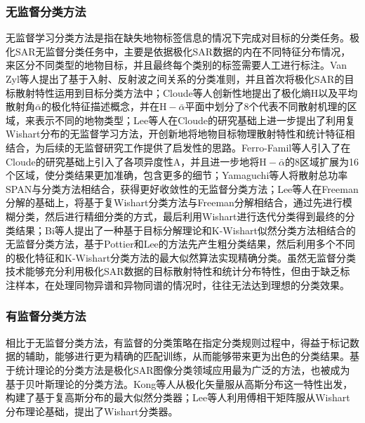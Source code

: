 \subsubsection{无监督分类方法}
无监督学习分类方法是指在缺失地物标签信息的情况下完成对目标的分类任务。极化SAR无监督分类任务中，主要是依据极化SAR数据的内在不同特征分布情况，来区分不同类型的地物目标，并且最终每个类别的标签需要人工进行标注。Van Zyl等人提出了基于入射、反射波之间关系的分类准则，并且首次将极化SAR的目标散射特性运用到目标分类方法中；Cloude等人创新性地提出了极化熵$\mathrm{H}$以及平均散射角$\bar{\alpha}$的极化特征描述概念，并在$\mathrm{H}-\bar{\alpha}$平面中划分了8个代表不同散射机理的区域，来表示不同的地物类型；Lee等人在Cloude的研究基础上进一步提出了利用复Wishart分布的无监督学习方法，开创新地将地物目标物理散射特性和统计特征相结合，为后续的无监督研究工作提供了启发性的思路。Ferro-Famil等人引入了在Cloude的研究基础上引入了各项异度性$\mathrm{A}$，并且进一步地将$\mathrm{H}-\bar{\alpha}$的8区域扩展为16个区域，使分类结果更加准确，包含更多的细节；Yamaguchi等人将散射总功率SPAN与分类方法相结合，获得更好收敛性的无监督分类方法；Lee等人在Freeman分解的基础上，将基于复Wishart分类方法与Freeman分解相结合，通过先进行模糊分类，然后进行精细分类的方式，最后利用Wishart进行迭代分类得到最终的分类结果；Bi等人提出了一种基于目标分解理论和K-Wishart似然分类方法相结合的无监督分类方法，基于Pottier和Lee的方法先产生粗分类结果，然后利用多个不同的极化特征和K-Wishart分类方法的最大似然算法实现精确分类。虽然无监督分类技术能够充分利用极化SAR数据的目标散射特性和统计分布特性，但由于缺乏标注样本，在处理同物异谱和异物同谱的情况时，往往无法达到理想的分类效果。

\subsubsection{有监督分类方法}
相比于无监督分类方法，有监督的分类策略在指定分类规则过程中，得益于标记数据的辅助，能够进行更为精确的匹配训练，从而能够带来更为出色的分类结果。基于统计理论的分类方法是极化SAR图像分类领域应用最为广泛的方法，也被成为基于贝叶斯理论的分类方法。Kong等人从极化矢量服从高斯分布这一特性出发，构建了基于复高斯分布的最大似然分类器；Lee等人利用傅相干矩阵服从Wishart分布理论基础，提出了Wishart分类器。

